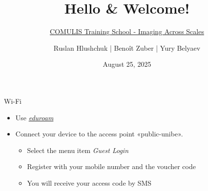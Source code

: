\documentclass[aspectratio=169,12pt]{beamer}
\title{Hello \& Welcome!}
\subtitle{\href{https://www.ana.unibe.ch/weiterbildung/comulis_training_school/}{COMULIS Training School - Imaging Across Scales}}
\author{Ruslan Hlushchuk | Benoît Zuber | Yury Belyaev}
\institute{Institute of Anatomy}
\date{August 25, 2025}
\begin{document}
\begin{frame}
  \titlepage
\end{frame}

\begin{frame}{Wi-Fi}
	\begin{itemize}
		\item Use \emph{\href{https://www.eduroam.org/}{eduroam}}
		\item Connect your device to the access point «public-unibe».
		\begin{itemize}
			\item Select the menu item \emph{Guest Login}
			\item Register with your mobile number and the voucher code
\begin{tcolorbox}[width=4cm,colframe=ubRed,title=Voucher code]
			\end{tcolorbox}
			\item You will receive your access code by SMS
		\end{itemize}
	\end{itemize}
\end{frame}
\end{document}
